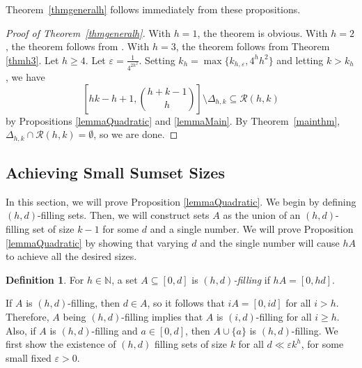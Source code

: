 \documentclass{daj}
\theoremstyle{definition}
\newtheorem{definition}[theorem]{Definition}
\theoremstyle{remark}
\numberwithin{equation}{section}
\numberwithin{theorem}{section}
\newcommand{\N}{\mathbb{N}}
\newcommand{\calr}{\mathcal{R}}
\begin{document}
Theorem~\ref{thmgeneralh} follows immediately from these propositions.

\begin{proof}[Proof of Theorem~\ref{thmgeneralh}]
    With $h=1$, the theorem is obvious. With $h=2$, the theorem follows from \cite{ES83}. With $h=3$, the theorem follows from Theorem \ref{thmh3}. Let $h \geq 4$. Let $\varepsilon = \frac{1}{4^{2h^2}}$. Setting $k_h = \max\{k_{h,\varepsilon},4^hh^2\}$ and letting $k>k_h$, we have \[\left[hk-h+1,\binom{h+k-1}{h}\right]\setminus \Delta_{h,k} \subseteq \calr(h,k)\] by Propositions \ref{lemmaQuadratic} and \ref{lemmaMain}. By Theorem~\ref{mainthm}, $\Delta_{h,k} \cap \calr(h,k) = \emptyset$, so we are done.
\end{proof}

\subsection{Achieving Small Sumset Sizes}\label{sectlemmaquad}
In this section, we will prove Proposition \ref{lemmaQuadratic}. We begin by defining $(h,d)$-filling sets. Then, we will construct sets $A$ as the union of an $(h,d)$-filling set of size $k-1$ for some $d$ and a single number. We will prove Proposition \ref{lemmaQuadratic} by showing that varying $d$ and the single number will cause $hA$ to achieve all the desired sizes. 

\begin{definition}
    For $h \in \N$, a set $A \subseteq [0,d]$ is \emph{$(h,d)$-filling} if $hA = [0,hd]$.
\end{definition}


If $A$ is $(h,d)$-filling, then $d \in A$, so it follows that $iA = [0,id]$ for all $i > h$. Therefore, $A$ being $(h,d)$-filling implies that $A$ is $(i,d)$-filling for all $i \geq h$. Also, if $A$ is $(h,d)$-filling and $a \in [0,d]$, then $A \cup \{a\}$ is $(h,d)$-filling. We first show the existence of $(h,d)$ filling sets of size $k$ for all $d \ll \varepsilon k^h$, for some small fixed $\varepsilon>0$.
\end{document}
